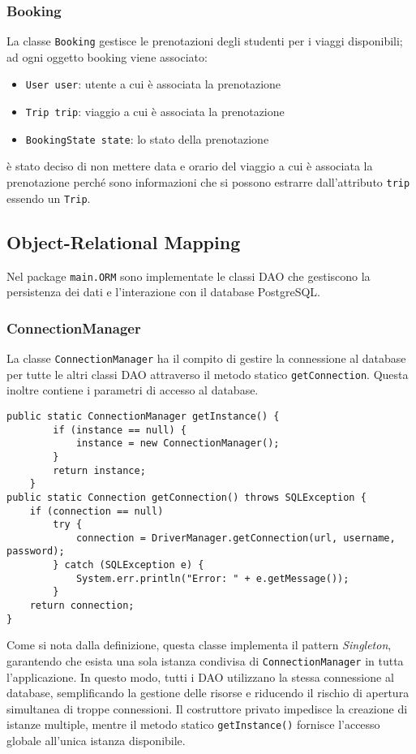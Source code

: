 \subsubsection{Booking}
La classe \texttt{Booking} gestisce le prenotazioni degli studenti per i viaggi disponibili; ad ogni oggetto booking viene associato:
\begin{itemize}
    \item \texttt{User user}: utente a cui è associata la prenotazione
    \item \texttt{Trip trip}: viaggio a cui è associata la prenotazione
    \item \texttt{BookingState state}: lo stato della prenotazione
\end{itemize}
è stato deciso di non mettere data e orario del viaggio a cui è associata la prenotazione perché sono informazioni che si possono estrarre dall'attributo \texttt{trip} essendo un \texttt{Trip}.

\subsection{Object-Relational Mapping}
Nel package \texttt{main.ORM} sono implementate le classi DAO che gestiscono la persistenza dei dati e l'interazione con il database PostgreSQL.
\subsubsection{ConnectionManager}
La classe \texttt{ConnectionManager} ha il compito di gestire la connessione al database per tutte le altri classi DAO attraverso il metodo statico \texttt{getConnection}. Questa inoltre contiene i parametri di accesso al database.
\begin{lstlisting}[style=java, caption={Implementazione del ConnectionManager}]
public static ConnectionManager getInstance() {
        if (instance == null) {
            instance = new ConnectionManager();
        }
        return instance;
    }
public static Connection getConnection() throws SQLException {
    if (connection == null)
        try {
            connection = DriverManager.getConnection(url, username, password);
        } catch (SQLException e) {
            System.err.println("Error: " + e.getMessage());
        }
    return connection;
}
\end{lstlisting}
Come si nota dalla definizione, questa classe implementa il pattern \textit{Singleton}, garantendo che esista una sola istanza condivisa di \texttt{ConnectionManager} in tutta l'applicazione. In questo modo, tutti i DAO utilizzano la stessa connessione al database, semplificando la gestione delle risorse e riducendo il rischio di apertura simultanea di troppe connessioni. Il costruttore privato impedisce la creazione di istanze multiple, mentre il metodo statico \texttt{getInstance()} fornisce l'accesso globale all'unica istanza disponibile.
